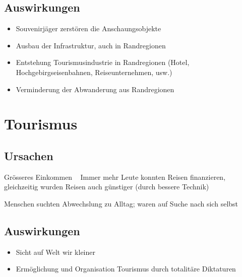 \documentclass{report}
\begin{document}
\subsection{Auswirkungen}
\begin{itemize}
	\item Souvenirjäger zerstören die Anschaungsobjekte
	\item Ausbau der Infrastruktur, auch in Randregionen
	\item Entstehung Tourismusindustrie in Randregionen (Hotel, Hochgebirgseisenbahnen, Reiseunternehmen, usw.)
	\item Verminderung der Abwanderung aus Randregionen
\end{itemize}

\section{Tourismus}
\subsection{Ursachen}
Grösseres Einkommen \arrow~ Immer mehr Leute konnten Reisen finanzieren, gleichzeitig wurden Reisen auch günstiger (durch bessere Technik)\par
Menschen suchten Abwechslung zu Alltag; waren auf Suche nach sich selbst

\subsection{Auswirkungen}
\begin{itemize}
	\item Sicht auf Welt wir kleiner
	\item Ermöglichung und Organisation Tourismus durch totalitäre Diktaturen
\end{itemize}
\end{document}
